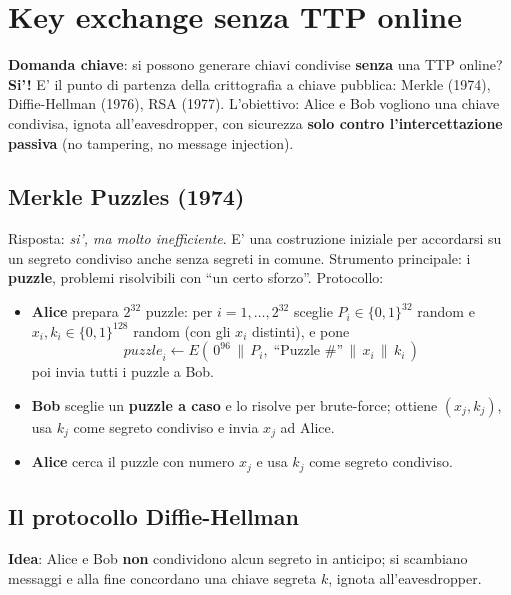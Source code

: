 \section{Key exchange senza TTP online}
\textbf{Domanda chiave}: si possono generare chiavi condivise \textbf{senza} una TTP online? \textbf{Si'!} E' il punto di partenza della crittografia a chiave pubblica: Merkle (1974), Diffie-Hellman (1976), RSA (1977). L'obiettivo: Alice e Bob vogliono una chiave condivisa, ignota all'eavesdropper, con sicurezza \textbf{solo contro l'intercettazione passiva} (no tampering, no message injection).

\subsection{Merkle Puzzles (1974)}
Risposta: \textit{si', ma molto inefficiente}. E' una costruzione iniziale per accordarsi su un segreto condiviso anche senza segreti in comune. Strumento principale: i \textbf{puzzle}, problemi risolvibili con ``un certo sforzo''.
Protocollo:
\begin{itemize}
  \item \textbf{Alice} prepara $ 2^{32} $ puzzle: per $ i = 1, \dots, 2^{32} $ sceglie $ P_i \in \{0,1\}^{32} $ random e $ x_i, k_i \in \{0,1\}^{128} $ random (con gli $ x_i $ distinti), e pone
    \[
      \textit{puzzle}_i \leftarrow E(\, 0^{96} \,\|\, P_i, \; \text{``Puzzle \#''} \,\|\, x_i \,\|\, k_i \,)
    \]
    poi invia tutti i puzzle a Bob.
  \item \textbf{Bob} sceglie un \textbf{puzzle a caso} e lo risolve per brute-force; ottiene $ (x_j, k_j) $, usa $ k_j $ come segreto condiviso e invia $ x_j $ ad Alice.
  \item \textbf{Alice} cerca il puzzle con numero $ x_j $ e usa $ k_j $ come segreto condiviso.
\end{itemize}

\subsection{Il protocollo Diffie-Hellman}
\textbf{Idea}: Alice e Bob \textbf{non} condividono alcun segreto in anticipo; si scambiano messaggi e alla fine concordano una chiave segreta $ k $, ignota all'eavesdropper.

